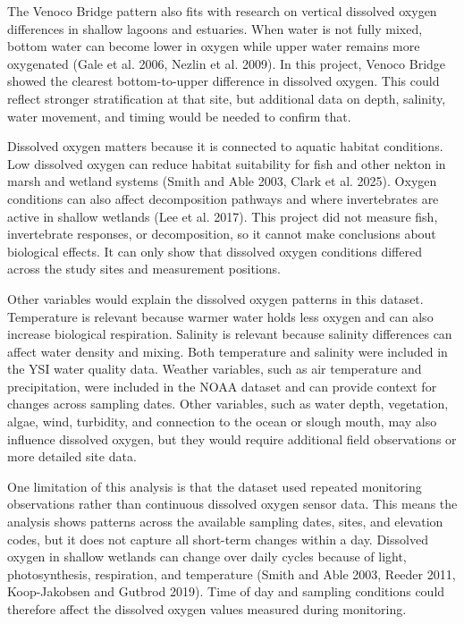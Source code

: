 \documentclass[
  letterpaper,
  DIV=11,
  numbers=noendperiod]{scrartcl}
\begin{document}
The Venoco Bridge pattern also fits with research on vertical dissolved
oxygen differences in shallow lagoons and estuaries. When water is not
fully mixed, bottom water can become lower in oxygen while upper water
remains more oxygenated (Gale et al. 2006, Nezlin et al. 2009). In this
project, Venoco Bridge showed the clearest bottom-to-upper difference in
dissolved oxygen. This could reflect stronger stratification at that
site, but additional data on depth, salinity, water movement, and timing
would be needed to confirm that.

Dissolved oxygen matters because it is connected to aquatic habitat
conditions. Low dissolved oxygen can reduce habitat suitability for fish
and other nekton in marsh and wetland systems (Smith and Able 2003,
Clark et al. 2025). Oxygen conditions can also affect decomposition
pathways and where invertebrates are active in shallow wetlands (Lee et
al. 2017). This project did not measure fish, invertebrate responses, or
decomposition, so it cannot make conclusions about biological effects.
It can only show that dissolved oxygen conditions differed across the
study sites and measurement positions.

Other variables would explain the dissolved oxygen patterns in this
dataset. Temperature is relevant because warmer water holds less oxygen
and can also increase biological respiration. Salinity is relevant
because salinity differences can affect water density and mixing. Both
temperature and salinity were included in the YSI water quality data.
Weather variables, such as air temperature and precipitation, were
included in the NOAA dataset and can provide context for changes across
sampling dates. Other variables, such as water depth, vegetation, algae,
wind, turbidity, and connection to the ocean or slough mouth, may also
influence dissolved oxygen, but they would require additional field
observations or more detailed site data.

One limitation of this analysis is that the dataset used repeated
monitoring observations rather than continuous dissolved oxygen sensor
data. This means the analysis shows patterns across the available
sampling dates, sites, and elevation codes, but it does not capture all
short-term changes within a day. Dissolved oxygen in shallow wetlands
can change over daily cycles because of light, photosynthesis,
respiration, and temperature (Smith and Able 2003, Reeder 2011,
Koop-Jakobsen and Gutbrod 2019). Time of day and sampling conditions
could therefore affect the dissolved oxygen values measured during
monitoring.
\end{document}
